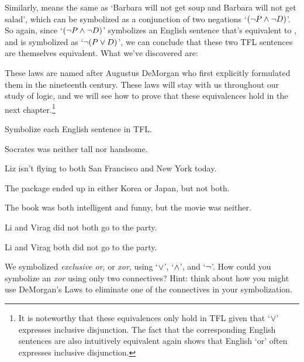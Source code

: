 Similarly,  means the same as `Barbara will not get soup and Barbara will not get salad', which can be symbolized as a conjunction of two negations `$(\neg P \wedge \neg D)$'.  So again, since `$(\neg P \wedge \neg D)$' symbolizes an English sentence that's equivalent to , and  is symbolized as `$\neg (P \vee D)$', we can conclude that these two TFL sentences are themselves equivalent.  What we've discovered are:


\noindent These  laws are named after Augustus DeMorgan who first explicitly formulated them in the nineteenth century.  These laws will stay with us throughout our study of logic, and we will see how to prove that these equivalences hold in the next chapter.\footnote{It is noteworthy that these equivalences only hold in TFL given that `$\vee$' expresses inclusive disjunction.  The fact that the corresponding English sentences are also intuitively equivalent again shows that English `or' often expresses inclusive disjunction.}

\practiceproblems
\problempart Symbolize each English sentence in TFL.

\begin{earg}
\item Socrates was neither tall nor handsome.
\item Liz isn't flying to both San Francisco and New York today.
\item The package ended up in either Korea or Japan, but not both.
\item The book was both intelligent and funny, but the movie was neither.
\item Li and Virag did not both go to the party.
\item Li and Virag both did not go to the party.
\end{earg}

\problempart
We symbolized \emph{exclusive or}, or \emph{xor}, using `$\vee$', `$\wedge$', and `$\neg$'. How could you symbolize an \emph{xor} using only two connectives? Hint: think about how you might use DeMorgan's Laws to eliminate one of the connectives in your symbolization.

